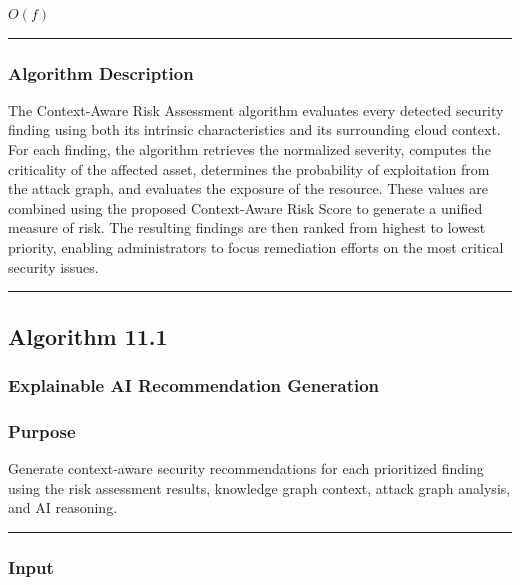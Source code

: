 $O(f)$

\begin{center}\rule{0.5\linewidth}{0.5pt}\end{center}

\subsubsection{Algorithm Description}

The Context-Aware Risk Assessment algorithm evaluates every detected security finding using both its intrinsic characteristics and its surrounding cloud context. For each finding, the algorithm retrieves the normalized severity, computes the criticality of the affected asset, determines the probability of exploitation from the attack graph, and evaluates the exposure of the resource. These values are combined using the proposed Context-Aware Risk Score to generate a unified measure of risk. The resulting findings are then ranked from highest to lowest priority, enabling administrators to focus remediation efforts on the most critical security issues.

\begin{center}\rule{0.5\linewidth}{0.5pt}\end{center}

\subsection{Algorithm 11.1}

\subsubsection{Explainable AI Recommendation Generation}

\subsubsection{\texorpdfstring{\textbf{Purpose}}{Purpose}}

Generate context-aware security recommendations for each prioritized finding using the risk assessment results, knowledge graph context, attack graph analysis, and AI reasoning.

\begin{center}\rule{0.5\linewidth}{0.5pt}\end{center}

\subsubsection{\texorpdfstring{\textbf{Input}}{Input}}


